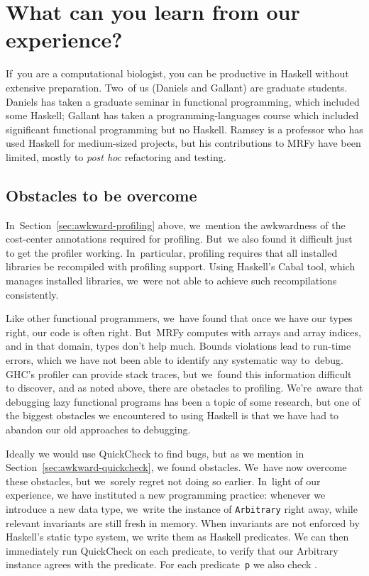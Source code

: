 \documentclass[nonatbib,preprint,blockstyle,times]{sigplanconf}
\newcommand\secref[1]{Section~\ref{sec:#1}}
\begin{document}
\section{What can you learn from our experience?}

If~you are a computational biologist, 
you can be productive in Haskell without extensive preparation.
Two~of us (Daniels and Gallant) are graduate students.
Daniels has taken a graduate seminar in functional programming, which
included some Haskell;
Gallant has taken a programming-languages course which included
significant functional programming but no Haskell.
Ramsey is a professor who has used Haskell 
for medium-sized projects,
but his contributions to MRFy have been limited, mostly to \emph{post hoc}
refactoring and testing.


\subsection{Obstacles to be overcome}

In~\secref{awkward-profiling} above, we~mention the awkwardness of the
cost-center annotations required for profiling.
But~we also found it difficult just to get the profiler working.
In~particular, profiling requires that all installed libraries be recompiled
with profiling support.
Using Haskell's Cabal tool, which manages installed libraries,
we~were not able to achieve such recompilations consistently.


Like other functional programmers, we~have found that 
once we have our types right, our code is often right.
But~MRFy computes with arrays and array indices,
and in that domain, types don't help much.
Bounds violations lead to run-time errors, which we have not been able
to identify any systematic way to~debug.
GHC's profiler can provide stack traces, but we~found this information
difficult to discover, and as noted above,
there are obstacles to profiling.
We're~aware that debugging lazy functional programs has been a topic
of some research,
but one of the biggest obstacles we encountered to using Haskell is
that we have had to abandon our old approaches to debugging.

Ideally we would use QuickCheck to find bugs, but as we mention in
\secref{awkward-quickcheck}, we found obstacles.
We~have now overcome these obstacles, but
we~sorely regret not doing so earlier.
In~light of our experience, we have instituted a new programming practice:
whenever we introduce a new data type,
we~write the instance of
\texttt{Arbitrary} right away, while
relevant invariants are still fresh in memory.
When invariants are not enforced by Haskell's static type system,
we write them as Haskell predicates.
We can then immediately run QuickCheck on each predicate, to verify
that our Arbitrary instance agrees with the predicate.
For each predicate~\texttt{p} we also check
.
\end{document}
